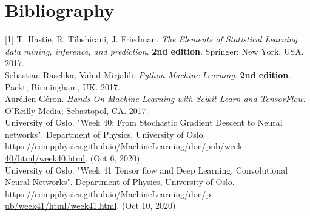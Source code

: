 \section{Bibliography}
\label{chap:Bibliography}

\label{Bib:The Elements Of Statistical Learning DataMining}[1] T. Hastie, R. Tibshirani, J. Friedman. \textit{The Elements of Statistical Learning data mining, inference, and prediction}. \textbf{2nd edition}. Springer; New York, USA. 2017.\\

\label{Bib:Python Machine Learning}\noindent [2] Sebastian Raschka, Vahid Mirjalili. \textit{Python Machine Learning}. \textbf{2nd edition}. Packt; Birmingham, UK. 2017.\\

\label{Bib:Hands-on Machine Learning}\noindent [3] Aurélien Géron. \textit{Hands-On Machine Learning with Scikit-Learn and TensorFlow}. O'Reilly Media; Sebastopol, CA. 2017.\\

\label{Bib:Week40Notes}\noindent [4] University of Oslo. "Week 40: From Stochastic Gradient Descent to Neural networks". Department of Physics, University of Oslo. \href{https://compphysics.github.io/MachineLearning/doc/pub/week40/html/week40.html}{https://compphysics.github.io/MachineLearning/doc/pub/week}
\href{https://compphysics.github.io/MachineLearning/doc/pub/week40/html/week40.html}{40/html/week40.html}. (Oct 6, 2020)\\

\label{Bib:Week41Notes}\noindent [5] University of Oslo. "Week 41 Tensor flow and Deep Learning, Convolutional Neural Networks". Department of Physics, University of Oslo. \href{https://compphysics.github.io/MachineLearning/doc/pub/week41/html/week41.html}{https://compphysics.github.io/MachineLearning/doc/p}
\href{https://compphysics.github.io/MachineLearning/doc/pub/week41/html/week41.html}{ub/week41/html/week41.html}. (Oct 10, 2020)\\
